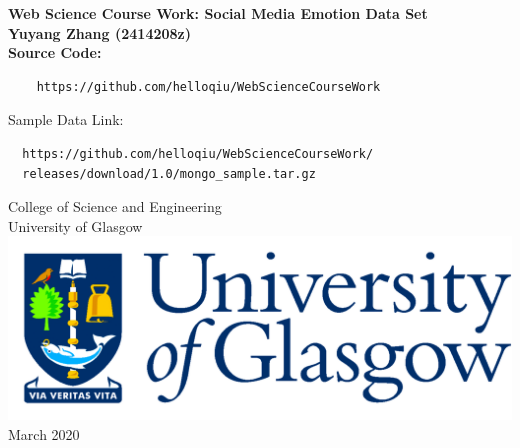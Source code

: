 \documentclass[12pt,titlepage,oneside]{article}
\begin{document}
\begin{titlepage}
  \centering
  \vspace*{3cm}  %
  \bfseries\Large
  Web Science Course Work: Social	Media	Emotion	Data	Set\\
  \vspace{3cm}
  \normalfont\large
  Yuyang Zhang (2414208z)\\
  \vspace{1cm}
  Source Code: \\
  \begin{verbatim}
    https://github.com/helloqiu/WebScienceCourseWork
  \end{verbatim}
  Sample Data Link: \\
  \begin{verbatim}
  https://github.com/helloqiu/WebScienceCourseWork/
  releases/download/1.0/mongo_sample.tar.gz
  \end{verbatim}
  \vspace{0.5cm}
  College of Science and Engineering\\
  University of Glasgow\\
  \vspace{1cm}
  \includegraphics[scale=0.125]{GlaLogo.pdf}
  \\
  \vspace{1cm}
  March 2020
\end{titlepage}
% 
\tableofcontents
% 




% 
\appendix

\end{document}
